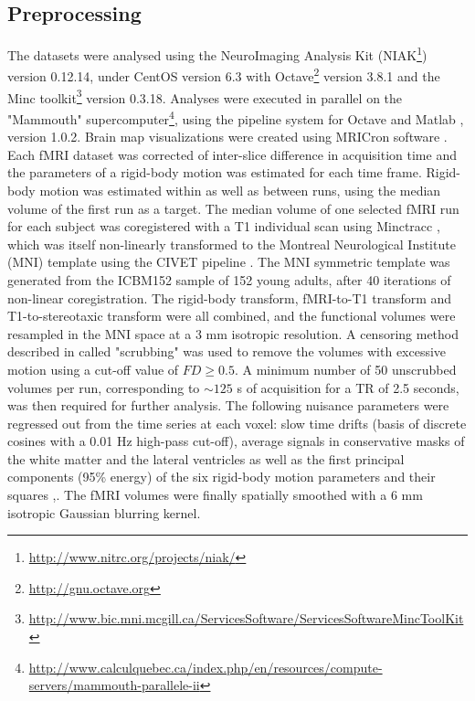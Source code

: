 \documentclass[authoryear]{elsarticle}
\begin{document}
\subsection{Preprocessing}\label{Preprocessing}
The datasets were analysed using the NeuroImaging Analysis Kit (NIAK\footnote{\url{http://www.nitrc.org/projects/niak/}}) version 0.12.14, under CentOS version 6.3 with Octave\footnote{\url{http://gnu.octave.org}} version 3.8.1 and the Minc toolkit\footnote{\url{http://www.bic.mni.mcgill.ca/ServicesSoftware/ServicesSoftwareMincToolKit}} version 0.3.18. Analyses were executed in parallel on the "Mammouth" supercomputer\footnote{\url{http://www.calculquebec.ca/index.php/en/resources/compute-servers/mammouth-parallele-ii}}, using the pipeline system for Octave and Matlab \citep{Bellec2010}, version 1.0.2. Brain map visualizations were created using MRICron software \cite{Rorden2007}. Each fMRI dataset was corrected of inter-slice difference in acquisition time and the parameters of a rigid-body motion was estimated for each time frame. Rigid-body motion was estimated within as well as between runs, using the median volume of the first run as a target. The median volume of one selected fMRI run for each subject 
was 
coregistered with a T1 individual scan using Minctracc \citep{Collins1998}, which was itself non-linearly transformed to the Montreal Neurological Institute (MNI) template \citep{Fonov2011} using the CIVET pipeline \citep{Zijdenbos2002}. The MNI symmetric template was generated from the ICBM152 sample of 152 young adults, after 40 iterations of non-linear coregistration. The rigid-body transform, fMRI-to-T1 transform and T1-to-stereotaxic transform were all combined, and the functional volumes were resampled in the MNI space at a 3 mm isotropic resolution. A censoring method described in \citep{Power2012} called "scrubbing" was used to remove the volumes with excessive motion using a cut-off value of $FD\geq0.5$. A minimum number of 50 unscrubbed volumes per run, corresponding to $\sim 125$ s of acquisition for a TR of 2.5 seconds, was then required for further analysis. The following nuisance parameters were regressed out from the time series at each voxel: slow time drifts (basis of discrete cosines 
with a 0.01 Hz high-pass cut-off), average signals in conservative masks of the white matter and the lateral ventricles as well as the first principal components (95\% energy) of the six rigid-body motion parameters and their squares \citep{Lund2006},\citep{Giove2009}. The fMRI volumes were finally spatially smoothed with a 6 mm isotropic Gaussian blurring kernel. 
\end{document}
